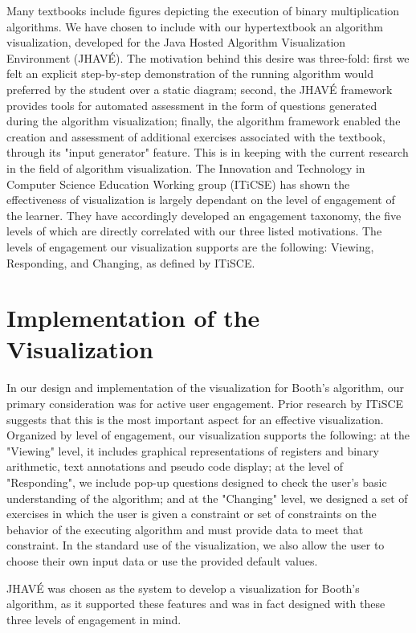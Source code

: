\documentclass{acm_proc_article-sp}
\begin{document}
Many textbooks include figures depicting the execution of binary multiplication algorithms.
We have chosen to include with our hypertextbook an algorithm visualization, developed for the Java Hosted Algorithm Visualization Environment (JHAVÉ).
The motivation behind this desire was three-fold: first we felt an explicit step-by-step demonstration of the running algorithm would preferred by the student over a static diagram; second, the JHAVÉ framework provides tools for automated assessment in the form of questions generated during the algorithm visualization; finally, the algorithm framework enabled the creation and assessment of additional exercises associated with the textbook, through its "input generator" feature.
This is in keeping with the current research in the field of algorithm visualization\cite{needsCitation}.
The Innovation and Technology in Computer Science Education Working group (ITiCSE) has shown the effectiveness of visualization is largely dependant on the level of engagement of the learner\cite{needsCitation}.
They have accordingly developed an engagement taxonomy, the five levels of which are directly correlated with our three listed motivations.
The levels of engagement our visualization supports are the following: Viewing, Responding, and Changing, as defined by ITiSCE.

\section{Implementation of the Visualization}
In our design and implementation of the visualization for Booth's algorithm, our primary consideration was for active user engagement.
Prior research by ITiSCE suggests that this is the most important aspect for an effective visualization.\cite{ITiSCE}
Organized by level of engagement, our visualization supports the following: at the "Viewing" level, it includes graphical representations of registers and binary arithmetic, text annotations and pseudo code
 display; at the level of "Responding", we include pop-up questions designed to check the user's basic understanding of the algorithm; and at the "Changing" level, we designed a set of exercises in which the user is given a constraint or set of constraints on the behavior of the executing algorithm and must provide data to meet that constraint.
In the standard use of the visualization, we also allow the user to choose their own input data or use the provided default values.

JHAVÉ was chosen as the system to develop a visualization for Booth's algorithm, as it supported these features and was in fact designed with these three levels of engagement in mind.\cite{JHAVE}
\end{document}
